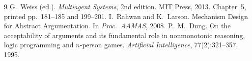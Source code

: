 \documentclass[11pt,a4paper]{article}
\begin{document}
\begin{thebibliography}{9}
 G.~Weiss (ed.). \emph{Multiagent Systems}, 2nd edition. MIT Press, 2013. Chapter~5, printed pp.~181--185 and 199--201.
 I.~Rahwan and K.~Larson. Mechanism Design for Abstract Argumentation. In \emph{Proc.\ AAMAS}, 2008.
 P.~M.~Dung. On the acceptability of arguments and its fundamental role in nonmonotonic reasoning, logic programming and $n$-person games. \emph{Artificial Intelligence}, 77(2):321--357, 1995.
\end{thebibliography}
\end{document}

